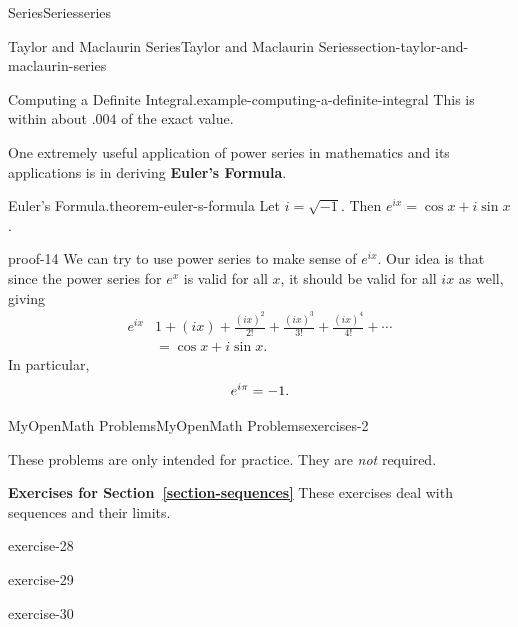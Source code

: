 \documentclass[oneside,10pt,]{book}
\newcommand{\terminology}[1]{\textbf{#1}}
\renewcommand{\qedhere}{\relax}
\numberwithin{equation}{section}
\newcommand{\amp}{&}
\begin{document}
\begin{chapterptx}{Series}{}{Series}{}{}{series}
\begin{sectionptx}{Taylor and Maclaurin Series}{}{Taylor and Maclaurin Series}{}{}{section-taylor-and-maclaurin-series}
\begin{example}{Computing a Definite Integral.}{example-computing-a-definite-integral}
This is within about \(.004\) of the exact value.%
\end{example}
\hypertarget{p-980}{}%
One extremely useful application of power series in mathematics and its applications is in deriving \terminology{Euler's Formula}.%
\begin{theorem}{Euler's Formula.}{}{theorem-euler-s-formula}%
\hypertarget{p-981}{}%
Let \(i = \sqrt{-1}\). Then \(e^{ix} = \cos x + i\sin x\).%
\end{theorem}
\begin{proofptx}{}{proof-14}
\hypertarget{p-982}{}%
We can try to use power series to make sense of \(e^{ix}\). Our idea is that since the power series for \(e^{x}\) is valid for all \(x\), it should be valid for all \(ix\) as well, giving%
\begin{align*}
e^{ix} \amp 1 + (ix) + \frac{(ix)^{2}}{2!} + \frac{(ix)^{3}}{3!} + \frac{(ix)^{4}}{4!} + \cdots \\
\amp = \cos x + i\sin x \text{.}
\end{align*}
In particular,%
\begin{equation*}
e^{i\pi} = -1\text{.}\qedhere
\end{equation*}
%
\end{proofptx}
\end{sectionptx}
%
%
\typeout{************************************************}
\typeout{************************************************}
%
\begin{exercises-section}{MyOpenMath Problems}{}{MyOpenMath Problems}{}{}{exercises-2}
\begin{introduction}{}%
\hypertarget{p-983}{}%
These problems are only intended for practice. They are \emph{not} required.%
\end{introduction}%
\par\medskip\noindent%
\textbf{Exercises for Section~\ref*{section-sequences}}\space\space\hypertarget{exercisegroup-8}{}%
\hypertarget{p-984}{}%
These exercises deal with sequences and their limits.%
\begin{exercisegroup}
\begin{divisionexerciseeg}{1}{}{}{exercise-28}%
\end{divisionexerciseeg}%
\begin{divisionexerciseeg}{2}{}{}{exercise-29}%
\end{divisionexerciseeg}%
\begin{divisionexerciseeg}{3}{}{}{exercise-30}%
\end{divisionexerciseeg}%

\end{exercisegroup}
\end{exercises-section}
\end{chapterptx}
\end{document}
